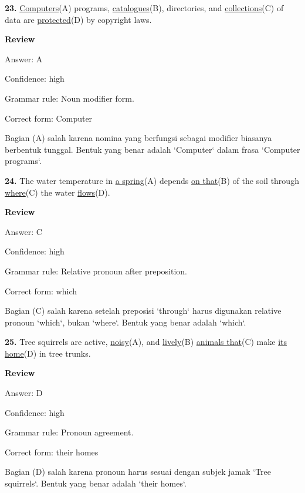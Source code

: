 \documentclass[12pt]{article}
\begin{document}
\endgroup
\par
\vspace{\questionblockgap}
\noindent\textbf{23.} \uline{Computers}(A) programs, \uline{catalogues}(B), directories, and \uline{collections}(C) of data are \uline{protected}(D) by copyright laws.
\par
\begingroup
\setlength{\parskip}{0pt}
\setlength{\parindent}{0pt}
\textbf{Review}\par
Answer: A\par
Confidence: high\par
Grammar rule: Noun modifier form.\par
Correct form: Computer\par
Bagian (A) salah karena nomina yang berfungsi sebagai modifier biasanya berbentuk tunggal. Bentuk yang benar adalah `Computer` dalam frasa `Computer programs`.\par
\endgroup
\par
\vspace{\questionblockgap}
\noindent\textbf{24.} The water temperature in \uline{a spring}(A) depends \uline{on that}(B) of the soil through \uline{where}(C) the water \uline{flows}(D).
\par
\begingroup
\setlength{\parskip}{0pt}
\setlength{\parindent}{0pt}
\textbf{Review}\par
Answer: C\par
Confidence: high\par
Grammar rule: Relative pronoun after preposition.\par
Correct form: which\par
Bagian (C) salah karena setelah preposisi `through` harus digunakan relative pronoun `which`, bukan `where`. Bentuk yang benar adalah `which`.\par
\endgroup
\par
\vspace{\questionblockgap}
\noindent\textbf{25.} Tree squirrels are active, \uline{noisy}(A), and \uline{lively}(B) \uline{animals that}(C) make \uline{its home}(D) in tree trunks.
\par
\begingroup
\setlength{\parskip}{0pt}
\setlength{\parindent}{0pt}
\textbf{Review}\par
Answer: D\par
Confidence: high\par
Grammar rule: Pronoun agreement.\par
Correct form: their homes\par
Bagian (D) salah karena pronoun harus sesuai dengan subjek jamak `Tree squirrels`. Bentuk yang benar adalah `their homes`.\par
\end{document}
